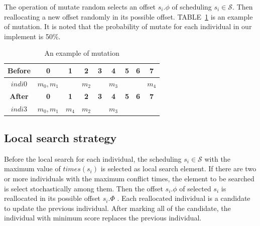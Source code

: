 \documentclass[journal]{IEEEtran}
\newcommand{\calS}{\mathcal{S}}
\theoremstyle{remark}
\begin{document}
The operation of mutate random selects an offset $s_i.\phi$ of scheduling $s_i\in\calS$.
Then reallocating a new offset randomly in its possible offset.
TABLE~\ref{t:mutation} is an example of mutation.
It is noted that the probability of mutate for each individual in our implement is 50\%.
\begin{table}[!t]
	\renewcommand{\arraystretch}{1.3}
	\newcommand{\tabincell}[2]{\begin{tabular}{@{}#1@{}}#2\end{tabular}}
	\caption{An example of mutation}
	\label{t:mutation}
	\centering
	\begin{tabular}{|c||c||c||c||c||c||c||c||c|}
		\hline
		\textbf{Before}& 
		\textbf{0} & 
		\textbf{1} & 
		\textbf{2} & 
		\textbf{3} &
		\textbf{4} & 
		\textbf{5} & 
		\textbf{6} & 
		\textbf{7} \\		
		\hline
		$indi0$	&$m_0,m_1$&	&$m_2$&	&$m_3$& & &$m_4$\\		
		\hline
		\hline
		\textbf{After}& 
		\textbf{0} & 
		\textbf{1} & 
		\textbf{2} & 
		\textbf{3} &
		\textbf{4} & 
		\textbf{5} & 
		\textbf{6} & 
		\textbf{7} \\		
		\hline
		$indi3$	&$m_0,m_1$&$m_4$&$m_2$&	&$m_3$& & &\\			
		\hline
	\end{tabular}
\end{table}


\subsection{Local search strategy \label{s:loc}}

Before the local search for each individual,
 the scheduling $s_i\in\calS$ with the maximum value of $times(s_i)$ is selected as local search element.
If there are two or more individuals with the maximum conflict times,
 the element to be searched is select stochastically among them.
Then the offset $s_i.\phi$ of selected $s_i$ is reallocated in its possible offset $s_i.\Phi$ .
Each reallocated individual is a candidate to update the previous individual.
After marking all of the candidate, the individual with minimum score replaces the previous individual.
\end{document}
